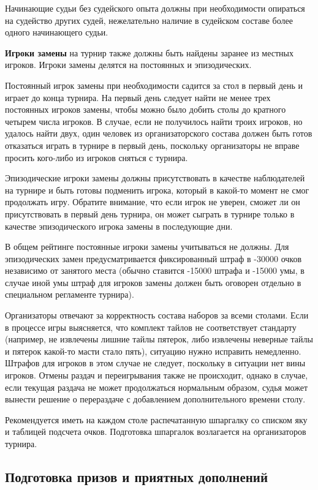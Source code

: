 Начинающие судьи без судейского опыта должны при необходимости опираться на судейство других судей, нежелательно наличие в судейском составе более одного начинающего судьи.

\textbf{Игроки замены} на турнир также должны быть найдены заранее из местных игроков. Игроки замены делятся на постоянных и эпизодических. 

Постоянный игрок замены при необходимости садится за стол в первый день и играет до конца турнира. На первый день следует найти не менее трех постоянных игроков замены, чтобы можно было добить столы до кратного четырем числа игроков. В случае, если не получилось найти троих игроков, но удалось найти двух, один человек из организаторского состава должен быть готов отказаться играть в турнире в первый день, поскольку организаторы не вправе просить кого-либо из игроков сняться с турнира.

Эпизодические игроки замены должны присутствовать в качестве наблюдателей на турнире и быть готовы подменить игрока, который в какой-то момент не смог продолжать игру. Обратите внимание, что если игрок не уверен, сможет ли он присутствовать в первый день турнира, он может сыграть в турнире только в качестве эпизодического игрока замены в последующие дни. 

В общем рейтинге постоянные игроки замены учитываться не должны. Для эпизодических замен предусматривается фиксированный штраф в -30000 очков независимо от занятого места (обычно ставится -15000 штрафа и -15000 умы, в случае иной умы штраф для игроков замены должен быть оговорен отдельно в специальном регламенте турнира).

Организаторы отвечают за корректность состава наборов за всеми столами. Если в процессе игры выясняется, что комплект тайлов не соответствует стандарту (например, не извлечены лишние тайлы пятерок, либо извлечены неверные тайлы и пятерок какой-то масти стало пять), ситуацию нужно исправить немедленно. Штрафов для игроков в этом случае не следует, поскольку в ситуации нет вины игроков. Отмены раздач и переигрывания также не происходит, однако в случае, если текущая раздача не может продолжаться нормальным образом, судья может вынести решение о перераздаче с добавлением дополнительного времени столу.

Рекомендуется иметь на каждом столе распечатанную шпаргалку со списком яку и таблицей подсчета очков. Подготовка шпаргалок возлагается на организаторов турнира.

\subsection{Подготовка призов и приятных дополнений}

